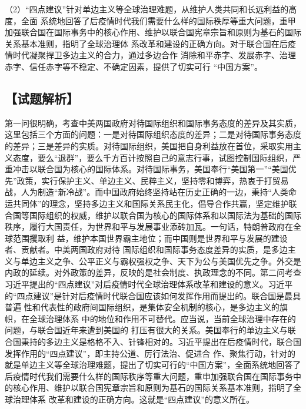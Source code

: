 \documentclass[UTF8,11pt]{ctexart}
\begin{document}
（2）“四点建议”针对单边主义等全球治理难题，从维护人类共同和长远利益的高度，全面 系统地回答了后疫情时代我们需要什么样的国际秩厚等重大问题，重甲加强联合国在国际事务中的核心作用、维护以联合国宪章宗旨和原则为基石的国际关系基本准则，指明了全球治理体 系改革和建设的正确方向。对于联合国在后疫情时代凝聚捍卫多边主义的合力，通过多边合作 消除和平赤字、发展赤字、治理赤字、信任赤字等不稳定、不确定因素，提供了切实可行 “中国方案”。


\subsection*{【试题解析】}

第一问很明确，考查中美两国政府对待国际组织和国际事务态度的差异及其实质，这里包括三个方面的问题：一是对待国际组织态度的差异；二是对待国际事务态度的差异；三是差异的实质。对待国际组织，美国把自身利益放在首位，采取实用主义态度，要么“退群”，要么千方百计按照自己的意志行事，试图控制国际组织，严重冲击以联合国为核心的国际体系。对待国际事务，美国奉行“美国第一”“美国优先”政策，实行保护主义、单边主义、民粹主义，坚持零和博弈，热衷于打贸易战，人为制造“新冷战”。而中国政府始终坚持站在历史正确的一边，秉持“人类命运共同体”的理念，坚持多边主义和国际关系民主化，倡导合作共赢，坚定维护联合国等国际组织的权威，维护以联合国为核心的国际体系和以国际法为基础的国际秩序，履行大国责任，为世界和平与发展事业添砖加瓦。一句话，特朗普政府在全球范围攫取利 益，维护本国世界霸主地位；而中国则是世界和平与发展的建设者、贡献者。中美两国政府对待 国际组织和国际事务态度差异的实质，是多边主义与单边主义之争、公平正义与霸权强权之争、天下为公与美国优先之争。外交是内政的延续。对外政策的差异，反映的是社会制度、执政理念的不同。第二问考查习近平提出的“四点建议”对后疫情时代全球治理体系改革和建设的意义。习近平的“四点建议”是针对后疫情时代联合国应该如何发挥作用而提出的。联合国是最具普遍 性和代表性的政府间国际组织，是集体安全机制的核心，是多边主义的旗帜，在全球治理体系 中的地位和作用不可替代。应当说，当前全球治理中存在的问题，与联合国近年来遭到美国的 打压有很大的关系。美国奉行的单边主义与联合国秉持的多边主义是格格不入、针锋相对的。习近平提出在后疫情时代，联合国发挥作用的“四点建议”，即主持公道、厉行法治、促进合 作、聚焦行动，针对的就是单边主义等全球治理难题，提出了切实可行的“中国方案”，全面系统地回答了后疫情时代我们需要什么样的国际秩序等重大问题，重申加强联合国在国际事务中 的核心作用、维护以联合国宪章宗旨和原则为基石的国际关系基本准则，指明了全球治理体系 改革和建设的正确方向。这就是“四点建议”的意义所在。
\end{document}
